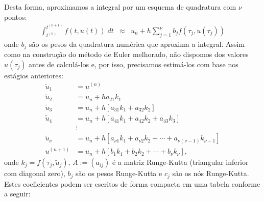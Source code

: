 Desta forma, aproximamos a integral por um esquema de quadratura com $\nu$ pontos:
\begin{eqnarray}
   \int_{t^{(n)}}^{t^{(n+1)}} f(t,u(t)) \; dt
           &\approx&u_n  + h\sum_{j=1}^\nu   b_j f\left(\tau_j,u(\tau_j)\right) %
\end{eqnarray}
onde $b_j$ são os pesos da quadratura numérica que aproxima a integral. Assim como na construção do método de Euler melhorado, não dispomos dos valores $u(\tau_j)$ antes de calculá-los e, por isso, precisamos estimá-los com base nos estágios anteriores:
\begin{equation}\label{eq:RKa}
  \begin{split}
    \tilde{u}_1 &= u^{(n)} \\
    \tilde{u}_2 &= u_n  + h a_{21}k_1 \\
    \tilde{u}_3 &= u_n  + h \left[a_{31}k_1 + a_{32}k_2\right] \\
    \tilde{u}_4 &= u_n  + h \left[a_{41}k_1 + a_{42}k_2 + a_{43}k_3\right] \\
    &\vdots \\
    \tilde{u}_\nu &= u_n  + h \left[a_{\nu 1}k_1 + a_{\nu 2}k_2 + \cdots +a_{\nu (\nu-1)}k_{\nu-1}\right] \\
    u^{(n+1)}&= u_n + h [ b_1k_1+b_2k_2+\cdots + b_\nu k_\nu],
  \end{split}
\end{equation}
onde $k_j=f\left(\tau_j,\tilde{u}_{j}\right)$, $A:=\left(a_{ij}\right)$ é a matriz Runge-Kutta (triangular inferior com diagonal zero), $b_j$ são os pesos Runge-Kutta e $c_j$ são os nós Runge-Kutta. Estes coeficientes podem ser escritos de forma compacta em uma tabela conforme a seguir:
